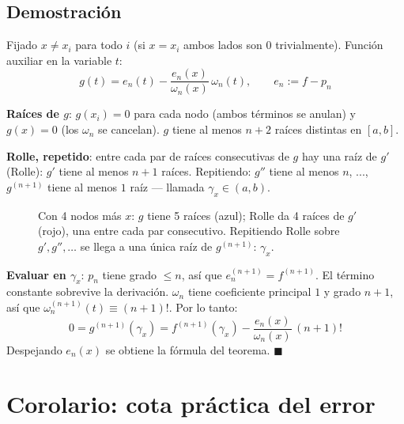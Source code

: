 \documentclass[12pt,a4paper]{article}
\begin{document}
\subsection{Demostración}

Fijado $x\neq x_i$ para todo $i$ (si $x=x_i$ ambos lados son $0$
trivialmente). Función auxiliar en la variable $t$:
$$g(t) = e_n(t) - \frac{e_n(x)}{\omega_n(x)}\,\omega_n(t), \qquad e_n:=f-p_n$$

\textbf{Raíces de $g$}: $g(x_i)=0$ para cada nodo (ambos términos se
anulan) y $g(x)=0$ (los $\omega_n$ se cancelan). $g$ tiene al menos $n+2$
raíces distintas en $[a,b]$.

\textbf{Rolle, repetido}: entre cada par de raíces consecutivas de $g$ hay
una raíz de $g'$ (Rolle): $g'$ tiene al menos $n+1$ raíces. Repitiendo:
$g''$ tiene al menos $n$, ..., $g^{(n+1)}$ tiene al menos $1$ raíz —
llamada $\gamma_x\in(a,b)$.

\begin{figure}[H]
\centering
{}
\caption{Con 4 nodos más $x$: $g$ tiene 5 raíces (azul); Rolle da 4 raíces
de $g'$ (rojo), una entre cada par consecutivo. Repitiendo Rolle sobre
$g',g'',\dots$ se llega a una única raíz de $g^{(n+1)}$: $\gamma_x$.}
\end{figure}

\textbf{Evaluar en $\gamma_x$}: $p_n$ tiene grado $\leq n$, así que
$e_n^{(n+1)} = f^{(n+1)}$. El término constante sobrevive la derivación.
$\omega_n$ tiene coeficiente principal $1$ y grado $n+1$, así que
$\omega_n^{(n+1)}(t)\equiv(n+1)!$. Por lo tanto:
$$0 = g^{(n+1)}(\gamma_x) = f^{(n+1)}(\gamma_x) - \frac{e_n(x)}{\omega_n(x)}\,(n+1)!$$
Despejando $e_n(x)$ se obtiene la fórmula del teorema. $\blacksquare$

\section{Corolario: cota práctica del error}
\end{document}
